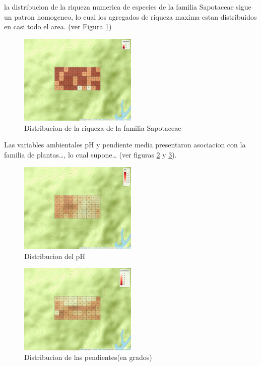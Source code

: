 \documentclass[11pt,]{article}
\begin{document}
la distribucion de la riqueza numerica de especies de la familia
Sapotaceae sigue un patron homogeneo, lo cual los agregados de riqueza
maxima estan distribuidos en casi todo el area. (ver Figura
\ref{fig:mapa_cuadros_riq_mi_familia})

\begin{figure}
\centering
\includegraphics[width=0.50000\textwidth]{mapa_cuadros_riq_mi_familia.png}
\caption{Distribucion de la riqueza de la familia
Sapotaceae\label{fig:mapa_cuadros_riq_mi_familia}}
\end{figure}

Las variables ambientales pH y pendiente media presentaron asociacion
con la familia de plantas\ldots{}, lo cual supone\ldots{} (ver figuras
\ref{fig:mapa_cuadros_pH} y \ref{fig:mapa_cuadros_pendiente}).

\begin{figure}
\centering
\includegraphics[width=0.50000\textwidth]{mapa_cuadros_ph.png}
\caption{Distribucion del pH\label{fig:mapa_cuadros_pH}}
\end{figure}

\begin{figure}
\centering
\includegraphics[width=0.50000\textwidth]{mapa_cuadros_pendiente.png}
\caption{Distribucion de las pendientes(en
grados)\label{fig:mapa_cuadros_pendiente}}
\end{figure}
\end{document}
